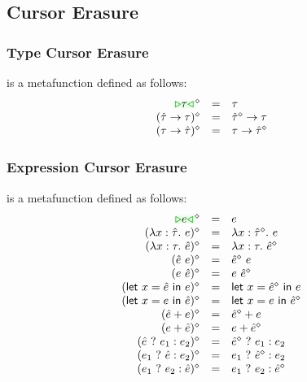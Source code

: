 \documentclass{article}
\begin{document}
\subsection{Cursor Erasure}
\subsubsection{Type Cursor Erasure}
\judgbox{\ensuremath{\cursorErase{\ZTMV}}} is a metafunction defined as follows:
%
\newcommand{\cursorErasesToRow}[2]{\ensuremath{\cursorErase{#1} & = & #2}}
\[\begin{array}{rcl}
  \cursorErasesToRow{\ZTCursor{\TMV}}{\TMV} \\
  \cursorErasesToRow{(\ZTArrowL{\ZTMV}{\TMV})}{\TArrow{\cursorErase{\ZTMV}}{\TMV}} \\
  \cursorErasesToRow{(\ZTArrowR{\TMV}{\ZTMV})}{\TArrow{\TMV}{\cursorErase{\ZTMV}}} \\
\end{array}\]

\subsubsection{Expression Cursor Erasure}
\judgbox{\ensuremath{\cursorErase{\ZMV}}} is a metafunction defined as follows:
%
\[\begin{array}{rcl}
  \cursorErasesToRow{\ZCursor{\EMV}}{\EMV} \\
  \cursorErasesToRow{(\ZLamT{x}{\ZTMV}{\EMV})}{\ELam{x}{\cursorErase{\ZTMV}}{\EMV}} \\
  \cursorErasesToRow{(\ZLamE{x}{\TMV}{\ZMV})}{\ELam{x}{\TMV}{\cursorErase{\ZMV}}} \\
  \cursorErasesToRow{(\ZApL{\ZMV}{\EMV})}{\EAp{\cursorErase{\ZMV}}{\EMV}} \\
  \cursorErasesToRow{(\ZApR{\EMV}{\ZMV})}{\EAp{\EMV}{\cursorErase{\ZMV}}} \\
  \cursorErasesToRow{(\ZLetL{x}{\ZMV}{\EMV})}{\ELet{x}{\cursorErase{\ZMV}}{\EMV}} \\
  \cursorErasesToRow{(\ZLetR{x}{\EMV}{\ZMV})}{\ELet{x}{\EMV}{\cursorErase{\ZMV}}} \\
  \cursorErasesToRow{(\ZPlusL{\ZMV}{\EMV})}{\EPlus{\cursorErase{\ZMV}}{\EMV}} \\
  \cursorErasesToRow{(\ZPlusR{\EMV}{\ZMV})}{\EPlus{\EMV}{\cursorErase{\ZMV}}} \\
  \cursorErasesToRow{(\ZIfC{\ZMV}{\EMV_1}{\EMV_2})}{\EIf{\cursorErase{\ZMV}}{\EMV_1}{\EMV_2}} \\
  \cursorErasesToRow{(\ZIfL{\EMV_1}{\ZMV}{\EMV_2})}{\EIf{\EMV_1}{\cursorErase{\ZMV}}{\EMV_2}} \\
  \cursorErasesToRow{(\ZIfL{\EMV_1}{\EMV_2}{\ZMV})}{\EIf{\EMV_1}{\EMV_2}{\cursorErase{\ZMV}}} \\
\end{array}\]
\end{document}
